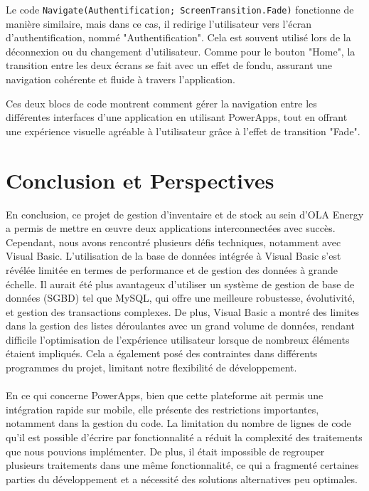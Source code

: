 \documentclass[a4paper, oneside, 12pt, final]{extreport}
\begin{document}
Le code \texttt{Navigate(Authentification; ScreenTransition.Fade)} fonctionne de manière similaire, mais dans ce cas, il redirige l'utilisateur vers l'écran d'authentification, nommé "Authentification". Cela est souvent utilisé lors de la déconnexion ou du changement d'utilisateur. Comme pour le bouton "Home", la transition entre les deux écrans se fait avec un effet de fondu, assurant une navigation cohérente et fluide à travers l'application.

\bigskip

Ces deux blocs de code montrent comment gérer la navigation entre les différentes interfaces d'une application en utilisant PowerApps, tout en offrant une expérience visuelle agréable à l'utilisateur grâce à l'effet de transition "Fade".

\chapter*{Conclusion et Perspectives}
En conclusion, ce projet de gestion d'inventaire et de stock au sein d'OLA Energy a permis de mettre en œuvre deux applications interconnectées avec succès. Cependant, nous avons rencontré plusieurs défis techniques, notamment avec Visual Basic. L'utilisation de la base de données intégrée à Visual Basic s'est révélée limitée en termes de performance et de gestion des données à grande échelle. Il aurait été plus avantageux d'utiliser un système de gestion de base de données (SGBD) tel que MySQL, qui offre une meilleure robustesse, évolutivité, et gestion des transactions complexes. De plus, Visual Basic a montré des limites dans la gestion des listes déroulantes avec un grand volume de données, rendant difficile l’optimisation de l’expérience utilisateur lorsque de nombreux éléments étaient impliqués. Cela a également posé des contraintes dans différents programmes du projet, limitant notre flexibilité de développement.
\\
\\
En ce qui concerne PowerApps, bien que cette plateforme ait permis une intégration rapide sur mobile, elle présente des restrictions importantes, notamment dans la gestion du code. La limitation du nombre de lignes de code qu'il est possible d’écrire par fonctionnalité a réduit la complexité des traitements que nous pouvions implémenter. De plus, il était impossible de regrouper plusieurs traitements dans une même fonctionnalité, ce qui a fragmenté certaines parties du développement et a nécessité des solutions alternatives peu optimales.
\\
\end{document}
